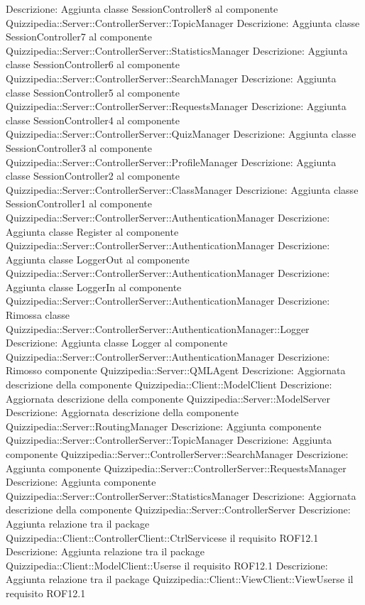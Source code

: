 Descrizione: Aggiunta classe SessionController8 al componente Quizzipedia::Server::ControllerServer::TopicManager 
Descrizione: Aggiunta classe SessionController7 al componente Quizzipedia::Server::ControllerServer::StatisticsManager 
Descrizione: Aggiunta classe SessionController6 al componente Quizzipedia::Server::ControllerServer::SearchManager 
Descrizione: Aggiunta classe SessionController5 al componente Quizzipedia::Server::ControllerServer::RequestsManager 
Descrizione: Aggiunta classe SessionController4 al componente Quizzipedia::Server::ControllerServer::QuizManager 
Descrizione: Aggiunta classe SessionController3 al componente Quizzipedia::Server::ControllerServer::ProfileManager 
Descrizione: Aggiunta classe SessionController2 al componente Quizzipedia::Server::ControllerServer::ClassManager 
Descrizione: Aggiunta classe SessionController1 al componente Quizzipedia::Server::ControllerServer::AuthenticationManager 
Descrizione: Aggiunta classe Register al componente Quizzipedia::Server::ControllerServer::AuthenticationManager 
Descrizione: Aggiunta classe LoggerOut al componente Quizzipedia::Server::ControllerServer::AuthenticationManager 
Descrizione: Aggiunta classe LoggerIn al componente Quizzipedia::Server::ControllerServer::AuthenticationManager 
Descrizione: Rimossa classe Quizzipedia::Server::ControllerServer::AuthenticationManager::Logger 
Descrizione: Aggiunta classe Logger al componente Quizzipedia::Server::ControllerServer::AuthenticationManager 
Descrizione: Rimosso componente Quizzipedia::Server::QMLAgent 
Descrizione: Aggiornata descrizione della componente Quizzipedia::Client::ModelClient 
Descrizione: Aggiornata descrizione della componente Quizzipedia::Server::ModelServer 
Descrizione: Aggiornata descrizione della componente Quizzipedia::Server::RoutingManager 
Descrizione: Aggiunta componente Quizzipedia::Server::ControllerServer::TopicManager 
Descrizione: Aggiunta componente Quizzipedia::Server::ControllerServer::SearchManager 
Descrizione: Aggiunta componente Quizzipedia::Server::ControllerServer::RequestsManager 
Descrizione: Aggiunta componente Quizzipedia::Server::ControllerServer::StatisticsManager 
Descrizione: Aggiornata descrizione della componente Quizzipedia::Server::ControllerServer 
Descrizione: Aggiunta relazione tra il package Quizzipedia::Client::ControllerClient::CtrlServicese il requisito ROF12.1 
Descrizione: Aggiunta relazione tra il package Quizzipedia::Client::ModelClient::Userse il requisito ROF12.1 
Descrizione: Aggiunta relazione tra il package Quizzipedia::Client::ViewClient::ViewUserse il requisito ROF12.1 
